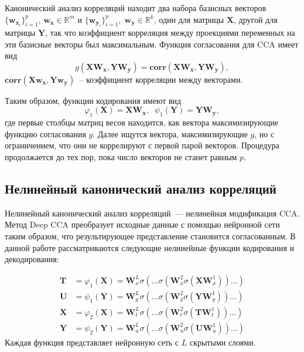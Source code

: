 \documentclass[12pt]{article}
\newcommand{\bx}{\mathbf{x}}
\newcommand{\by}{\mathbf{y}}
\newcommand{\bw}{\mathbf{w}}
\newcommand{\bY}{\mathbf{Y}}
\newcommand{\bX}{\mathbf{X}}
\newcommand{\bT}{\mathbf{T}}
\newcommand{\bU}{\mathbf{U}}
\newcommand{\bW}{\mathbf{W}}
\begin{document}
	Канонический анализ корреляций находит два набора базисных векторов $\{\bw_{\bx_i}\}_{i=1}^{p}$, $\bw_{\bx} \in \mathbb{R}^{m}$ и $\{\bw_{\by_i}\}_{i=1}^{p}, \; \bw_{\by} \in \mathbb{R}^{k}$, один для матрицы $\bX$, другой для матрицы $\bY$, так что коэффициент корреляция между проекциями переменных на эти базисные векторы был максимальным. Функция согласования для CCA имеет вид
	\begin{equation}
		g(\bX \bW_{\bx}, \bY \bW_{\by}) = \textbf{corr}(\bX \bW_{\bx}, \bY \bW_{\by}),
	\end{equation} 
	 $\textbf{corr}(\bX \bw_{\bx}, \bY \bw_{\by})$~-- коэффициент корреляции между векторами.
	
	\noindent Таким образом, функции кодирования имеют вид
	\begin{equation}
		\varphi_1(\bX) = \bX \bW_{\bx} , \;\;
		\psi_1(\bY) = \bY \bW_{\by},
	\end{equation}
	где первые столбцы матриц весов находится, как вектора максимизирующие функцию согласования $g$. Далее ищутся вектора, максимизирующие $g$, но с ограничением, что они не коррелируют с первой парой векторов. Процедура продолжается до тех пор, пока число векторов не станет равным $p$. 
	
	\subsection{Нелинейный канонический анализ корреляций}
	
	Нелинейный канонический анализ корреляций~--- нелинейная модификация CCA. Метод Deep CCA преобразует исходные данные с помощью нейронной сети таким образом, что результирующее представление становится согласованным. В данной работе рассматриваются следующие нелинейные функции кодирования и декодирования:
	
	\begin{align*}
		\bT &= \varphi_1(\bX) =  \bW_x^L \sigma(\dots \sigma(\bW_x^2 \sigma(\bX \bW_x^1)) \dots ) \\
		\bU &= \psi_1(\bY) =  \bW_y^L \sigma(\dots \sigma(\bW_y^2 \sigma(\bY \bW_y^1)) \dots ) \\
		\bX &= \varphi_2(\bX) =  \bW_t^L \sigma(\dots \sigma(\bW_t^2 \sigma(\bT \bW_t^1)) \dots ) \\
		\bY &= \psi_2(\bY) =  \bW_u^L \sigma(\dots \sigma(\bW_u^2 \sigma(\bU \bW_u^1)) \dots )
	\end{align*}
	Каждая функция представляет нейронную сеть с $L$ скрытыми слоями. 
	
\end{document}
